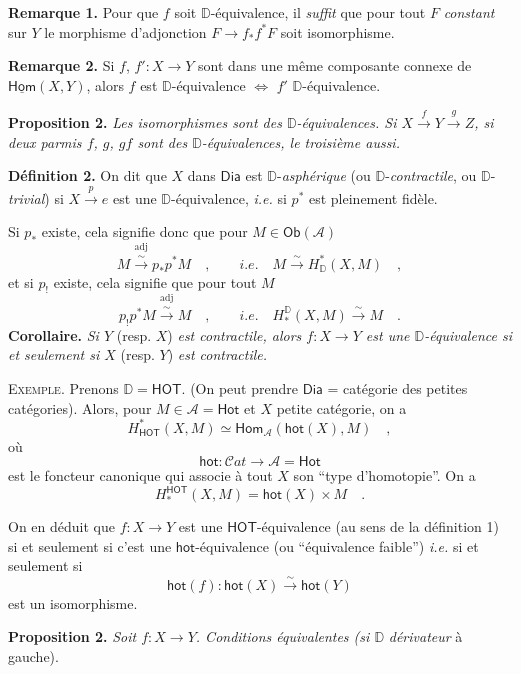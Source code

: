 \documentclass[11pt,leqno]{article}
\newcommand{\printedpage}[1]{\marginpar{\footnotesize p.~#1}}
\newcommand{\msp}[1]{\marginpar{\footnotesize [#1]}}
\newcommand{\DD}{\mathbb{D}}
\newcommand{\cA}{\mathcal{A}}
\newcommand{\Dia}{\mathsf{Dia}}
\newcommand{\Ob}{\mathsf{Ob}}
\newcommand{\hot}{\mathsf{hot}}
\newcommand{\Hot}{\mathsf{Hot}}
\newcommand{\HOT}{\mathsf{HOT}}
\newcommand{\isolongto}{\overset{\sim}{\longrightarrow}}
\newcommand{\sHom}{\mathsf{Hom}}
\newcommand{\uHom}{\underline{\mathsf{Hom}}}
\begin{document}
\noindent\textbf{Remarque 1.} Pour que $f$ soit $\DD$-équivalence, il \textit{suffit} que pour tout $F$ \textit{constant} sur $Y$ le morphisme d'adjonction $F \to f_*f^*F$ soit isomorphisme.

\noindent\textbf{Remarque 2.} Si $f$, $f' : X \to Y$ sont dans une même composante connexe de $\uHom(X, Y)$, alors $f$ est $\DD$-équivalence $\Leftrightarrow$ $f'$ $\DD$-équivalence.

\noindent\textbf{Proposition 2.} \textit{Les isomorphismes sont des $\DD$-équivalences. Si $X \overset{f}{\to} Y \overset{g}{\to} Z$, si deux parmis $f$, $g$, $gf$ sont des $\DD$-équivalences, le troisième aussi.} %

\noindent\textbf{Définition 2.} On dit que $X$ dans $\Dia$ est $\DD$-\textit{asphérique} (ou $\DD$-\textit{contractile}, ou $\DD$-\textit{trivial}) si $X \overset{p}{\to} e$ est une $\DD$-équivalence, \textit{i.e.} si $p^*$ est pleinement fidèle.

Si $p_*$ existe, cela signifie donc que pour $M \in \Ob(\cA)$
\[
M \overset{\mathrm{adj}}{\isolongto} p_*p^*M \quad , \qquad \textit{i.e.} \quad M \isolongto H^*_{\DD}(X, M) \quad ,
\]
et si $p_!$ existe, cela signifie que pour tout $M$
\[
p_!p^*M \overset{\mathrm{adj}}{\isolongto} M \quad , \qquad \textit{i.e.} \quad H^{\DD}_*(X, M) \isolongto M \quad .
\]
\textbf{Corollaire.} \textit{Si $Y$} (resp. $X$) \textit{est contractile, alors $f : X \to Y$ est une $\DD$-équivalence si et seulement si $X$} (resp. $Y$) \textit{est contractile.}

\noindent\textsc{Exemple}. Prenons $\DD = \HOT$. (On peut prendre $\Dia$ = catégorie des petites catégories). Alors, pour $M \in \cA = \Hot$ et $X$ petite catégorie, on a
\[
H^*_{\HOT}(X, M) \simeq \sHom_{\cA}(\hot(X), M) \quad ,
\]
où
\[
\hot : \mathcal{C}\mathit{at} \longrightarrow \cA = \Hot
\]
est le foncteur canonique qui associe à tout $X$ son “type d'homotopie”. On a
\[
H^{\HOT}_*(X, M) = \hot(X) \times M \quad .
\]

\noindent\msp{page 63}

\noindent On en déduit que $f : X \to Y$ est une $\HOT$-équivalence (au sens de la définition 1) si et seulement si c'est une $\hot$-équivalence (ou “équivalence faible”) \textit{i.e.} si et seulement si
\[
\hot(f) : \hot(X) \isolongto \hot(Y)
\]
\printedpage{37}
est un isomorphisme.

\noindent\textbf{Proposition 2.} \textit{Soit $f : X \to Y$. Conditions équivalentes (si $\DD$} \textit{dérivateur} à gauche). %
\end{document}
